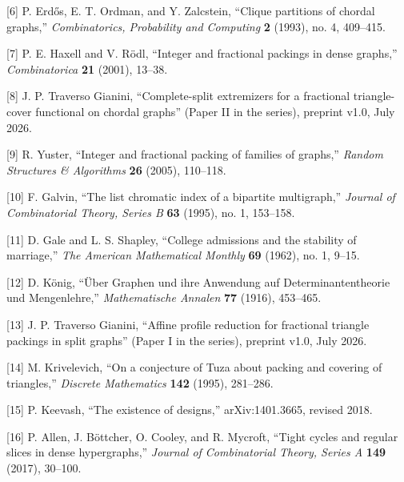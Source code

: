 \documentclass[
  11pt,
]{article}
\begin{document}
{[}6{]} P. Erdős, E. T. Ordman, and Y. Zalcstein, ``Clique partitions of chordal graphs,'' \emph{Combinatorics, Probability and Computing} \textbf{2} (1993), no. 4, 409--415.

{[}7{]} P. E. Haxell and V. Rödl, ``Integer and fractional packings in dense graphs,'' \emph{Combinatorica} \textbf{21} (2001), 13--38.

{[}8{]} J. P. Traverso Gianini, ``Complete-split extremizers for a fractional triangle-cover functional on chordal graphs'' (Paper II in the series), preprint v1.0, July 2026.

{[}9{]} R. Yuster, ``Integer and fractional packing of families of graphs,'' \emph{Random Structures \& Algorithms} \textbf{26} (2005), 110--118.

{[}10{]} F. Galvin, ``The list chromatic index of a bipartite multigraph,'' \emph{Journal of Combinatorial Theory, Series B} \textbf{63} (1995), no. 1, 153--158.

{[}11{]} D. Gale and L. S. Shapley, ``College admissions and the stability of marriage,'' \emph{The American Mathematical Monthly} \textbf{69} (1962), no. 1, 9--15.

{[}12{]} D. König, ``Über Graphen und ihre Anwendung auf Determinantentheorie und Mengenlehre,'' \emph{Mathematische Annalen} \textbf{77} (1916), 453--465.

{[}13{]} J. P. Traverso Gianini, ``Affine profile reduction for fractional triangle packings in split graphs'' (Paper I in the series), preprint v1.0, July 2026.

{[}14{]} M. Krivelevich, ``On a conjecture of Tuza about packing and covering of triangles,'' \emph{Discrete Mathematics} \textbf{142} (1995), 281--286.

{[}15{]} P. Keevash, ``The existence of designs,'' arXiv:1401.3665, revised 2018.

{[}16{]} P. Allen, J. Böttcher, O. Cooley, and R. Mycroft, ``Tight cycles and regular slices in dense hypergraphs,'' \emph{Journal of Combinatorial Theory, Series A} \textbf{149} (2017), 30--100.
\end{document}
